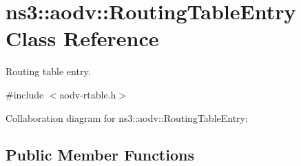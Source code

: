 \hypertarget{classns3_1_1aodv_1_1RoutingTableEntry}{}\section{ns3\+:\+:aodv\+:\+:Routing\+Table\+Entry Class Reference}
\label{classns3_1_1aodv_1_1RoutingTableEntry}


Routing table entry.  




{\ttfamily \#include $<$aodv-\/rtable.\+h$>$}



Collaboration diagram for ns3\+:\+:aodv\+:\+:Routing\+Table\+Entry\+:
\subsection*{Public Member Functions}
